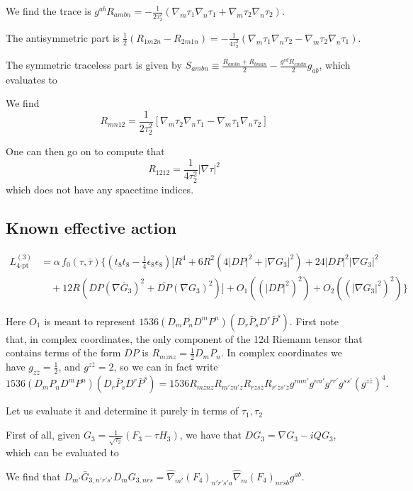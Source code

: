 We find the trace is $g^{ab} R_{ambn} = -\frac{1}{2\tau_2^2}(\nabla_m \tau_1 \nabla_n \tau_1 + \nabla_m \tau_2 \nabla_n\tau_2)$.

The antisymmetric part is $\frac{1}{2}(R_{1m2n} - R_{2m1n})
= -\frac{1}{4\tau_2^2}(\nabla_m\tau_1 \nabla_n\tau_2 - \nabla_m\tau_2 \nabla_n\tau_1)
$.

The symmetric traceless part is given by $S_{ambn} \equiv \frac{R_{ambn} + R_{bman}}{2} - \frac{g^{cd}R_{cmdn}}{2} g_{ab}$, which evaluates to

We find
$$
R_{mn12} = \frac{1}{2\tau_2^2}[\nabla_m\tau_2\nabla_n\tau_1-\nabla_m\tau_1\nabla_n\tau_2]
$$

One can then go on to compute that
$$
R_{1212} = \frac{1}{4\tau_2^2}|\nabla \tau|^2
$$
which does not have any spacetime indices.

\subsection{Known effective action}

\begin{align}
L_{\text{4-pt}}^{(3)}&=\alpha\, f_{0}(\tau,\bar{\tau})\biggl\{\left(t_{8}t_{8}-\tfrac{1}{4}\epsilon_{8}\epsilon_{8}\right)\biggl[R^4+6R^{2}\left(4|DP|^{2}+|\nabla G_{3}|^{2}\right)+24|DP|^{2}|\nabla G_{3}|^{2}\\[0.4em]
&\quad+12R\left(DP(\nabla\overline{G}_{3})^{2}+\overline{DP}(\nabla{G}_{3})^{2}\right)\biggr] +O_{1}\left((|DP|^{2})^{2}\right)+O_{2}\left((|\nabla G_{3}|^{2})^{2}\right)
\biggr\}
\label{eq:PTaction}
\end{align}

Here $O_1$ is meant to represent $1536 (D_m P_n D^m P^n)(D_r \bar{P}_s D^r \bar{P}^s)$.
First note that, in complex coordinates, the only component of the 12d Riemann tensor that contains terms of the form $DP$ is $R_{mznz} = \frac{1}{2}D_m P_n$.
In complex coordinates we have $g_{z\bar{z}} = \tfrac12$, and $g^{z\bar{z}} = 2$, so we can in fact write
\begin{equation}
1536 (D_m P_n D^m P^n)(D_r \bar{P}_s D^r \bar{P}^s) = 1536 R_{mznz} R_{m'z n' z} R_{r\bar{z}s\bar{z}} R_{r'\bar{z}s'\bar{z}} g^{mm'} g^{nn'} g^{rr'} g^{ss'} (g^{z\bar{z}})^4.
\end{equation}


Let us evaluate it and determine it purely in terms of $\tau_1, \tau_2$

First of all, given $G_3 = \frac{1}{\sqrt{\tau_2}}(F_3-\tau H_3)$, we have that $DG_3 = \nabla G_3 - iQ G_3$, which can be evaluated to

We find that $D_{m'}\bar{G}_{3,n'r's'}D_{m}G_{3,nrs} = \hat{\nabla}_{m'}(F_4)_{n'r's'a} \hat{\nabla}_{m}(F_4)_{nrs b} g^{ab}$.


